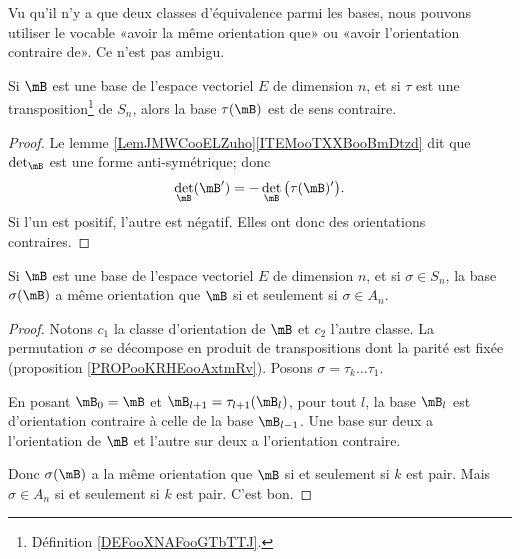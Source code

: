 \begin{normaltext}
    Vu qu'il n'y a que deux classes d'équivalence parmi les bases, nous pouvons utiliser le vocable «avoir la même orientation que» ou «avoir l'orientation contraire de». Ce n'est pas ambigu.
\end{normaltext}

\begin{proposition}
    Si \( \mB\) est une base de l'espace vectoriel \( E\) de dimension \( n\), et si \( \tau\) est une transposition\footnote{Définition \ref{DEFooXNAFooGTbTTJ}.} de \( S_n\), alors la base \( \tau(\mB)\) est de sens contraire.
\end{proposition}

\begin{proof}
    Le lemme \ref{LemJMWCooELZuho}\ref{ITEMooTXXBooBmDtzd} dit que \( \det_{\mB}\) est une forme anti-symétrique; donc
    \begin{equation}
        \det_{\mB}(\mB')=-\det_{\mB}\big( \tau(\mB)' \big).
    \end{equation}
    Si l'un est positif, l'autre est négatif. Elles ont donc des orientations contraires.
\end{proof}

\begin{corollary}
    Si \( \mB\) est une base de l'espace vectoriel \( E\) de dimension \( n\), et si \( \sigma\in S_n\), la base \( \sigma(\mB)\) a même orientation que \( \mB\) si et seulement si \( \sigma\in A_n\).
\end{corollary}

\begin{proof}
    Notons \( c_1\) la classe d'orientation de \( \mB\) et \( c_2\) l'autre classe. La permutation \( \sigma\) se décompose en produit de transpositions dont la parité est fixée (proposition \ref{PROPooKRHEooAxtmRv}). Posons \( \sigma=\tau_k\ldots \tau_1\).

    En posant \( \mB_0=\mB\) et \( \mB_{l+1}=\tau_{l+1}(\mB_l)\), pour tout \( l\), la base \( \mB_l\) est d'orientation contraire à celle de la base \( \mB_{l-1}\). Une base sur deux a l'orientation de \( \mB\) et l'autre sur deux a l'orientation contraire.

    Donc \( \sigma(\mB)\) a la même orientation que \( \mB\) si et seulement si \( k\) est pair. Mais \( \sigma\in A_n\) si et seulement si \( k\) est pair. C'est bon.
\end{proof}

